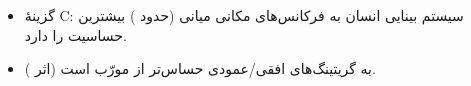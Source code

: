 \begin{itemize}
    \item[(الف)] گزینهٔ C: سیستم بینایی انسان  به فرکانس‌های مکانی میانی (حدود ) بیشترین حساسیت را دارد.
    \item[(ب)] به گریتینگ‌های افقی/عمودی حساس‌تر از مورّب است (اثر ).
\end{itemize}
